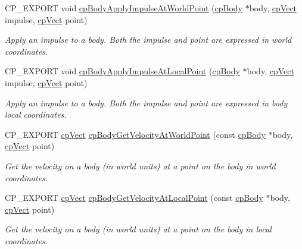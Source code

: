 \begin{DoxyCompactItemize}
\mbox{\label{group__cpBody_ga279494c5ddcfd7d76ec23ab7906d99dd}} 
C\+P\+\_\+\+E\+X\+P\+O\+RT void \hyperlink{group__cpBody_ga279494c5ddcfd7d76ec23ab7906d99dd}{cp\+Body\+Apply\+Impulse\+At\+World\+Point} (\hyperlink{structcpBody}{cp\+Body} $\ast$body, \hyperlink{structcpVect}{cp\+Vect} impulse, \hyperlink{structcpVect}{cp\+Vect} point)
\begin{DoxyCompactList}\small\item\em Apply an impulse to a body. Both the impulse and point are expressed in world coordinates. \end{DoxyCompactList}\item 
\mbox{\label{group__cpBody_ga0bd09fbbf2a3260b7cda569dacec0a33}} 
C\+P\+\_\+\+E\+X\+P\+O\+RT void \hyperlink{group__cpBody_ga0bd09fbbf2a3260b7cda569dacec0a33}{cp\+Body\+Apply\+Impulse\+At\+Local\+Point} (\hyperlink{structcpBody}{cp\+Body} $\ast$body, \hyperlink{structcpVect}{cp\+Vect} impulse, \hyperlink{structcpVect}{cp\+Vect} point)
\begin{DoxyCompactList}\small\item\em Apply an impulse to a body. Both the impulse and point are expressed in body local coordinates. \end{DoxyCompactList}\item 
\mbox{\label{group__cpBody_gac53993c244cf2f792e6ae096b50ea9c3}} 
C\+P\+\_\+\+E\+X\+P\+O\+RT \hyperlink{structcpVect}{cp\+Vect} \hyperlink{group__cpBody_gac53993c244cf2f792e6ae096b50ea9c3}{cp\+Body\+Get\+Velocity\+At\+World\+Point} (const \hyperlink{structcpBody}{cp\+Body} $\ast$body, \hyperlink{structcpVect}{cp\+Vect} point)
\begin{DoxyCompactList}\small\item\em Get the velocity on a body (in world units) at a point on the body in world coordinates. \end{DoxyCompactList}\item 
\mbox{\label{group__cpBody_ga5ce88dc62ccd4a7dffe59d0fa217f61e}} 
C\+P\+\_\+\+E\+X\+P\+O\+RT \hyperlink{structcpVect}{cp\+Vect} \hyperlink{group__cpBody_ga5ce88dc62ccd4a7dffe59d0fa217f61e}{cp\+Body\+Get\+Velocity\+At\+Local\+Point} (const \hyperlink{structcpBody}{cp\+Body} $\ast$body, \hyperlink{structcpVect}{cp\+Vect} point)
\begin{DoxyCompactList}\small\item\em Get the velocity on a body (in world units) at a point on the body in local coordinates. \end{DoxyCompactList}\item 

\end{DoxyCompactItemize}
